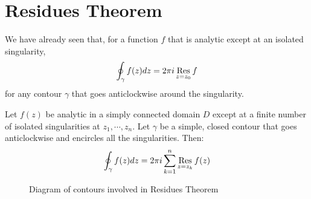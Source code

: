 \documentclass[../Main.tex]{subfiles}
\begin{document}
\section{Residues Theorem}
We have already seen that, for a function $f$ that is analytic except at an isolated singularity,
\begin{equation*}
    \oint_{\gamma} f(z) dz = 2\pi i \operatorname*{Res}_{z = z_0} f
\end{equation*}
for any contour $\gamma$ that goes anticlockwise around the singularity.
\begin{theorem}
    Let $f(z)$ be analytic in a simply connected domain $D$ except at a finite number of isolated singularities at $z_1, \cdots, z_n$. Let $\gamma$ be a simple, closed contour that goes anticlockwise and encircles all the singularities. Then:
    \begin{equation*}
        \oint_\gamma f(z) dz = 2\pi i \sum_{k=1}^{n} \operatorname*{Res}_{z = z_k} f(z)
    \end{equation*}
    \label{thmResidues}
\end{theorem}
\begin{figure}
    \centering
    \caption{Diagram of contours involved in Residues Theorem}
    \label{figResiduesDiagram}
\end{figure}
\end{document}
